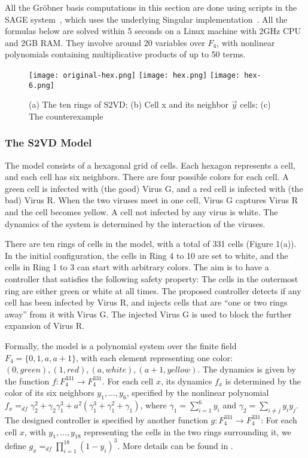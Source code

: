 \documentclass[envcountsect]{llncs}
\begin{document}
{{All the Gr\"obner basis computations in this section are done using scripts in the SAGE system~\cite{sage}, which uses the underlying Singular implementation~\cite{singular}. All the formulas below are solved within 5 seconds on a Linux machine with 2GHz CPU and 2GB RAM. They involve around 20 variables over $F_4$, with nonlinear polynomials containing multiplicative products of up to 50 terms.  

\begin{figure}[ht]
\centering
\label{fig}
\texttt{[image: original-hex.png]}\hspace{.25in}
\texttt{[image: hex.png]}\hspace{.25in}
\texttt{[image: hex-6.png]}
\caption{(a) The ten rings of S2VD; (b) Cell x and its neighbor $\vec y$ cells; (c) The counterexample}
\end{figure}

\subsubsection{The S2VD Model}The model consists of a hexagonal grid of cells. Each hexagon represents a cell, and each cell has six neighbors. There are four possible colors for each cell. A green cell is infected with (the good) Virus G, and a red cell is infected with (the bad) Virus R. When the two viruses meet in one cell, Virus G captures Virus R and the cell becomes yellow. A cell not infected by any virus is white. The dynamics of the system is determined by the interaction of the viruses. 

There are ten rings of cells in the model, with a total of 331 cells (Figure 1(a)). In the initial configuration, the cells in Ring 4 to 10 are set to white, and the cells in Ring 1 to 3 can start with arbitrary colors. The aim is to have a controller that satisfies the following safety property: The cells in the outermost ring are either green or white at all times. The proposed controller detects if any cell has been infected by Virus R, and injects cells that are ``one or two rings away'' from it with Virus G. The injected Virus G is used to block the further expansion of Virus R.

Formally, the model is a polynomial system over the finite field $F_4=\{0,1,a,a+1\}$, with each element representing one color: $(0, green), (1, red), (a, white), (a+1, yellow)$. The dynamics is given by the function $f: F_4^{331}\rightarrow F_4^{331}.$ For each cell $x$, its dynamics $f_x$ is determined by the color of its six neighbors $y_1,...,y_6$, specified by the nonlinear polynomial $f_x=_{df}\gamma_2^2+ \gamma_2\gamma_1^3+a^2(\gamma_1^3+\gamma_1^2+\gamma_1)$, where $\gamma_1 = \sum_{i=1}^6 y_i$ and $\gamma_2 = \sum_{i\neq j} y_iy_j$. The designed controller is specified by another function $g:F_4^{331}\rightarrow F_4^{331}$: For each cell $x$, with $y_1,...,y_{18}$ representing the cells in the two rings surrounding it, we define $g_x=_{df}\prod_{i=1}^{18} (1-y_i)^3$. More details can be found in \cite{virus}.

}}
\end{document}
